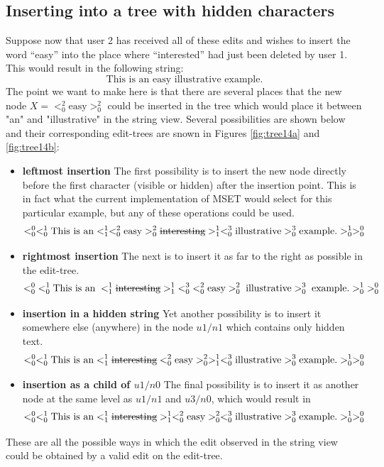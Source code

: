 \documentclass{amsart}
\begin{document}
\subsection{Inserting into a tree with hidden characters}
Suppose now that user 2 has received all of these edits
and wishes to insert the word ``easy''
into the place where ``interested'' had just been deleted by user 1.
This would result in the following string:
\[
\text{This is an easy illustrative example.}
\]
The point we want to make here is that there are several places that the new node
$X = <^2_0 \text{easy} >^2_0$ could be inserted in the tree
which would place it between "an" and "illustrative" in the string view.
Several possibilities are shown below and their corresponding edit-trees
are snown in Figures \ref{fig:tree14a} and \ref{fig:tree14b}:
\begin{itemize}
\item {\bf leftmost insertion}
The first possibility is to insert the new node directly before the
first character (visible or hidden) after the insertion point. This
is in fact what the current implementation of MSET would select
for this particular example,
but any of these operations could be used.
\[
 <^0_0 <^1_0 
 \text{This is an} 
   <^1_1 <^2_0 \text{easy} >^2_0 \text{\sout{interesting}} >^1_1
  <^3_0 \text{illustrative} >^3_0
  \text{example.} >^1_0 >^0_0
\]
\item {\bf rightmost insertion}
The next is to insert it as far to the right as possible in
the edit-tree.
\[
 <^0_0 \;<^1_0 
 \text{This is an} 
   \;<^1_1 \text{\sout{interesting}} >^1_1\;
  <^3_0 \;<^2_0 \text{easy} >^2_0 \;\text{illustrative} >^3_0\;
  \text{example.} >^1_0\; >^0_0
\]
\item {\bf insertion in a hidden string}
Yet another possibility is to insert it somewhere else (anywhere) in the node $u1/n1$
which contains only hidden text.
\[
 <^0_0 <^1_0 
 \text{This is an} 
   <^1_1 \text{\sout{interesting}} <^2_0 \text{easy} >^2_0>^1_1
  <^3_0 \text{illustrative} >^3_0
  \text{example.} >^1_0 >^0_0
\]
\item {\bf insertion as a child of $u1/n0$}
The final possibility is to insert it as another node at the same level
as $u1/n1$ and $u3/n0$, which would result in
\[
 <^0_0 <^1_0 
 \text{This is an} 
   <^1_1 \text{\sout{interesting}}>^1_1
   <^2_0 \text{easy} >^2_0
   <^3_0 \text{illustrative} >^3_0
 \text{example.} >^1_0 >^0_0
\]
\end{itemize}
These are all the possible ways in which the edit observed in the string view
could be obtained by a valid edit on the edit-tree.
\end{document}
